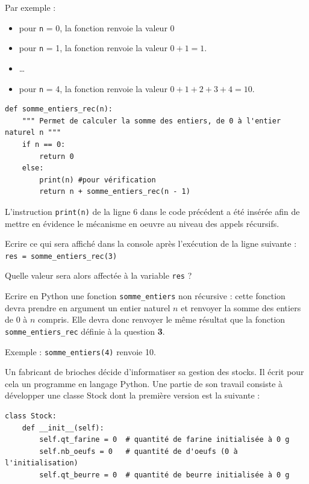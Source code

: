\documentclass[11pt,a4paper]{article}
\begin{document}
Par exemple :
\begin{itemize}
    \item[\textbullet] pour {\tt n} = 0, la fonction renvoie la valeur  0
    \item[\textbullet] pour {\tt n} = 1, la fonction renvoie la valeur  $0 + 1 = 1$.
    \item[] \dots
    \item[\textbullet]  pour {\tt n} = 4, la fonction renvoie la valeur $0 + 1 + 2 + 3 + 4 = 10$.
\end{itemize}
\begin{lstlisting}
def somme_entiers_rec(n):
    """ Permet de calculer la somme des entiers, de 0 à l'entier naturel n """
    if n == 0:
        return 0
    else:
        print(n) #pour vérification
        return n + somme_entiers_rec(n - 1)
\end{lstlisting}
L'instruction {\tt print(n)} de la ligne 6 dans le code précédent a été insérée afin de mettre en évidence le mécanisme en oeuvre au niveau des appels récursifs.
\SQListe
\item Ecrire ce qui sera affiché dans la console après l'exécution de la ligne suivante : \\
{\tt res = somme\_entiers\_rec(3)}
\item Quelle valeur sera alors affectée à la variable {\tt res} ?
\FinListe
\item Ecrire en Python une fonction {\tt somme\_entiers} non récursive : cette fonction devra prendre en argument un entier naturel $n$ et renvoyer la somme des entiers de 0 à $n$ compris. Elle devra donc renvoyer le même résultat que la fonction {\tt somme\_entiers\_rec} définie à la question {\bf 3}.

Exemple : {\tt somme\_entiers(4)} renvoie 10.
\FinListe

\separateur




Un fabricant de brioches décide d’informatiser sa gestion des stocks. Il écrit pour cela un programme en langage Python. Une partie de son travail consiste à développer une classe Stock dont la première version est la suivante :

\begin{lstlisting}
class Stock:
    def __init__(self):
        self.qt_farine = 0  # quantité de farine initialisée à 0 g
        self.nb_oeufs = 0   # quantité de d'oeufs (0 à l'initialisation)
        self.qt_beurre = 0  # quantité de beurre initialisée à 0 g
\end{lstlisting}
\end{document}
